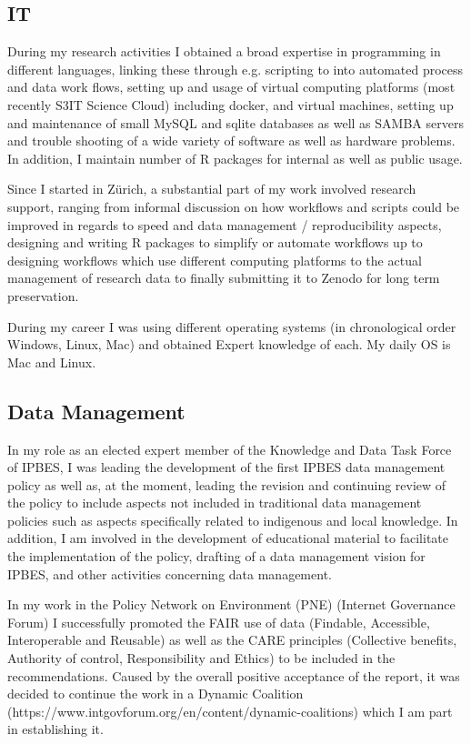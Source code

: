 \documentclass[a4paper]{article}
\begin{document}
\subsection{IT}

During my research activities I obtained a broad expertise in programming in
	different languages, linking these through e.g. scripting to into
	automated process and data work flows, setting up and usage of virtual
	computing platforms (most recently S3IT Science Cloud) including docker,
	and virtual machines, setting up and maintenance of small MySQL and
	sqlite databases as well as SAMBA servers and trouble shooting of a wide
	variety of software as well as hardware problems. In addition, I maintain
	number of R packages for internal as well as public usage.

Since I started in Zürich, a substantial part of my work involved research
	support, ranging from informal discussion on how workflows and scripts
	could be improved in regards to speed and data management /
	reproducibility aspects, designing and writing R packages to simplify or
	automate workflows up to designing workflows which use different
	computing platforms to the actual management of research data to finally
	submitting it to Zenodo for long term preservation.

During my career I was using different operating systems (in chronological
	order Windows, Linux, Mac) and obtained Expert knowledge of each. My
	daily OS is Mac and Linux. 

\subsection{Data Management}


In my role as an elected expert member of the Knowledge and Data Task Force
	of IPBES, I was leading the development of the first IPBES data
	management policy as well as, at the moment, leading the revision and
	continuing review of the policy to include aspects not included in
	traditional data management policies such as aspects specifically related
	to indigenous and local knowledge. In addition, I am involved in the
	development of educational material to facilitate the implementation of
	the policy, drafting of a data management vision for IPBES, and other
	activities concerning data management.

In my work in the Policy Network on Environment (PNE)  (Internet Governance
	Forum) I successfully promoted the FAIR use of data (Findable,
	Accessible, Interoperable and Reusable) as well as the CARE principles
	(Collective benefits, Authority of control, Responsibility and Ethics) to
	be included in the recommendations. Caused by the overall positive
	acceptance of the report, it was decided to continue the work in a
	Dynamic Coalition
	(https://www.intgovforum.org/en/content/dynamic-coalitions) which I am
	part in establishing it.
\end{document}

